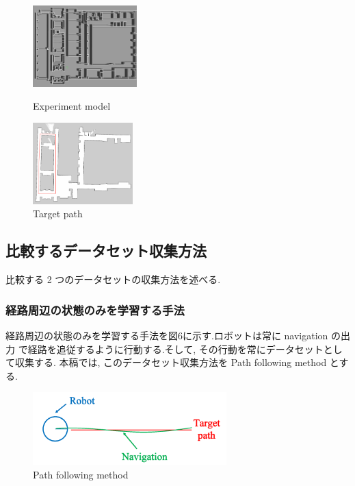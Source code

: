 \documentclass{jarticle}
\begin{document}
\begin{figure}[htbp]
  \begin{minipage}{0.5\hsize}
   \centering
   \includegraphics[width=40.1mm]{figs/gazebo.png}
   \caption{Experiment model}
  \end{minipage}
  \begin{minipage}{0.5\hsize}
   \centering
   \includegraphics[width=38.5mm]{figs/rviz.png}
   \caption{Target path}
  \end{minipage}
 \end{figure}


\subsection{比較するデータセット収集方法}
比較する 2 つのデータセットの収集方法を述べる.\\

\subsubsection{経路周辺の状態のみを学習する手法}
経路周辺の状態のみを学習する手法を図6に示す.ロボットは常に navigation の出力
で経路を追従するように行動する.そして, その行動を常にデータセットとして収集する.
本稿では, このデータセット収集方法を Path following method とする.

\begin{figure}[h!]
  \centering
   \includegraphics[height=28mm]{./figs/dl.png}
   \caption{Path following method}
\end{figure}
\end{document}
